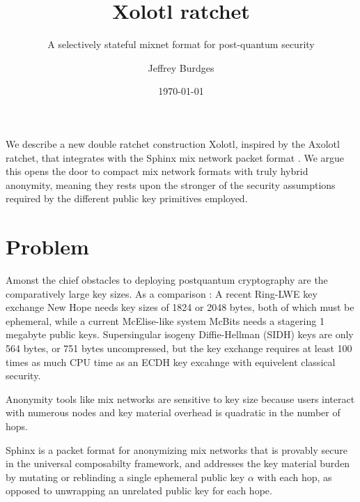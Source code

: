 \documentclass[twoside,letterpaper]{sig-alternate}
\title{Xolotl ratchet}
\subtitle{A selectively stateful mixnet format for post-quantum security}
\author{Jeffrey Burdges}
\date{\today}
\begin{document}
\maketitle



We describe a new double ratchet construction Xolotl,
 inspired by the Axolotl ratchet, %
that integrates with the Sphinx mix network packet format \cite{Sphinx}.
We argue this opens the door to compact mix network formats with
truly hybrid anonymity, meaning they rests upon the stronger of the
security assumptions required by the different public key primitives employed.


\section{Problem} %

Amonst the chief obstacles to deploying postquantum cryptography are
the comparatively large key sizes.  As a comparison : 
%
A recent Ring-LWE key exchange New Hope \cite[\S7, p.10]{NewHope} needs
 key sizes of 1824 or 2048 bytes, both of which must be ephemeral,
while a current McElise-like system McBits %
 needs a stagering 1 megabyte public keys.
%
Supersingular isogeny Diffie-Hellman (SIDH) \cite[p. 21]{SIDH-2016} keys
are only 564 bytes, or 751 bytes uncompressed, but
 the key exchange requires at least 100 times as much CPU time as
 an ECDH key excahnge with equivelent classical security.

Anonymity tools like mix networks are sensitive to key size because 
users interact with numerous nodes and key material overhead is 
quadratic in the number of hops. %

\smallskip

Sphinx \cite{Sphinx} is a packet format for anonymizing mix networks
that is provably secure in the universal composabilty framework, and
 addresses the key material burden by mutating or reblinding a
 single ephemeral public key $\alpha$ with each hop,
 as opposed to unwrapping an unrelated public key for each hope.
\end{document}
